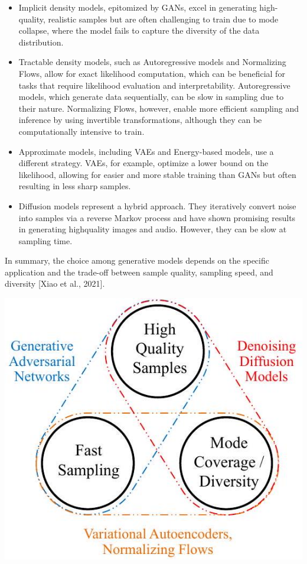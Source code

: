 \documentclass[10pt]{article}
\begin{document}
\begin{itemize}
  \item Implicit density models, epitomized by GANs, excel in generating high-quality, realistic samples but are often challenging to train due to mode collapse, where the model fails to capture the diversity of the data distribution.

  \item Tractable density models, such as Autoregressive models and Normalizing Flows, allow for exact likelihood computation, which can be beneficial for tasks that require likelihood evaluation and interpretability. Autoregressive models, which generate data sequentially, can be slow in sampling due to their nature. Normalizing Flows, however, enable more efficient sampling and inference by using invertible transformations, although they can be computationally intensive to train.

  \item Approximate models, including VAEs and Energy-based models, use a different strategy. VAEs, for example, optimize a lower bound on the likelihood, allowing for easier and more stable training than GANs but often resulting in less sharp samples.

  \item Diffusion models represent a hybrid approach. They iteratively convert noise into samples via a reverse Markov process and have shown promising results in generating highquality images and audio. However, they can be slow at sampling time.

\end{itemize}

In summary, the choice among generative models depends on the specific application and the trade-off between sample quality, sampling speed, and diversity [Xiao et al., 2021].

\begin{center}
\includegraphics[max width=\textwidth]{2024_01_08_a381fc3992661ee7020eg-03}
\end{center}
\end{document}
